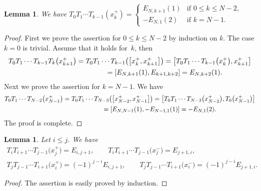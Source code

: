\documentclass[11pt]{article}
\newtheorem{lem}[thm]{Lemma}
\theoremstyle{definition}
\numberwithin{equation}{section}
\begin{document}
\begin{lem}\label{lem:0_to_k}We have $T_0 T_1 \cdots T_{k-1} (x_k^+) = \begin{cases}
E_{N,k+1}(1) & \text{if $0 \leq k \leq N-2$},\\
-E_{N,1}(2) & \text{if $k=N-1$}.
\end{cases}$
\end{lem}
\begin{proof} First we prove the assertion for $0 \leq k \leq N-2$ by induction on $k$. The case $k=0$ is trivial. Assume that it holds for~$k$, then
\begin{gather*}
T_0 T_1 \cdots T_{k-1} T_{k} \big(x_{k+1}^+\big) = T_0 T_1 \cdots T_{k-1} \big(\big[x_{k}^+, x_{k+1}^+\big]\big) = \big[T_0 T_1 \cdots T_{k-1}\big(x_{k}^+\big), x_{k+1}^+\big] \\
\hphantom{T_0 T_1 \cdots T_{k-1} T_{k} \big(x_{k+1}^+\big)}{} = [E_{N,k+1}(1), E_{k+1,k+2}] = E_{N,k+2}(1).
\end{gather*}
Next we prove the assertion for $k=N-1$. We have
\begin{gather*}
T_0 T_1 \cdots T_{N-2} \big(x_{N-1}^+\big) = T_0 T_1 \cdots T_{N-3} \big(\big[x_{N-2}^+, x_{N-1}^+\big]\big) = \big[T_0 T_1 \cdots T_{N-3}\big(x_{N-2}^+\big), T_0\big(x_{N-1}^+\big)\big] \\
\hphantom{T_0 T_1 \cdots T_{N-2} \big(x_{N-1}^+\big)}{} = [E_{N,N-1}(1), -E_{N-1,1}(1)] = -E_{N,1}(2).
\end{gather*}
The proof is complete.
\end{proof}

\begin{lem}Let $i \leq j$. We have
\begin{gather}
T_{i} T_{i+1} \cdots T_{j-1} \big(x_{j}^+\big) = E_{i,j+1},\qquad T_{i} T_{i+1} \cdots T_{j-1} \big(x_{j}^-\big) = E_{j+1,i}, \label{eq:increase}\\
T_{j} T_{j-1} \cdots T_{i+1} \big(x_{i}^+\big) = (-1)^{j-i}E_{i,j+1},\qquad T_{j} T_{j-1} \cdots T_{i+1} \big(x_{i}^-\big) = (-1)^{j-i}E_{j+1,i}. \label{eq:decrease}
\end{gather}
\end{lem}
\begin{proof}The assertion is easily proved by induction.
\end{proof}
\end{document}

